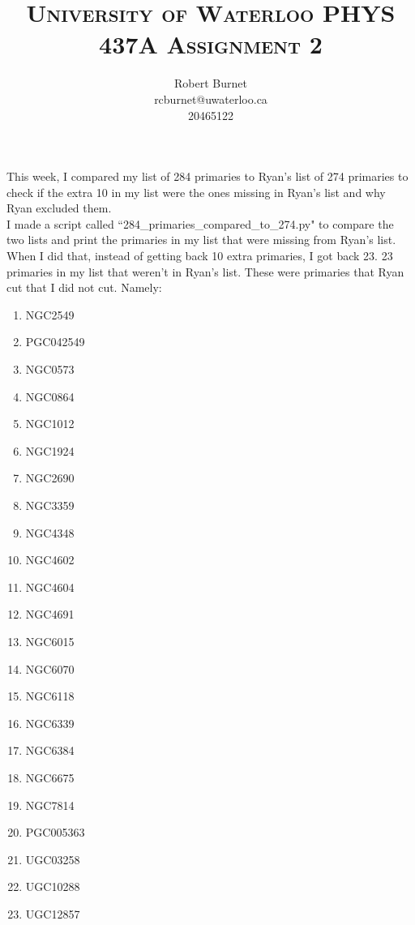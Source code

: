 \documentclass[10pt,letterpaper]{article}
\begin{document}
\title{\scshape\LARGE University of Waterloo \vfill \huge\bfseries PHYS 437A Assignment 2 \vfill}
\author{Robert Burnet \\ rcburnet@uwaterloo.ca \\ 20465122 }
\maketitle

\newpage

This week, I compared my list of 284 primaries to Ryan's list of 274 primaries to check if the extra 10 in my list were the ones missing in Ryan's list and why Ryan excluded them.\\

I made a script called ``284\_primaries\_compared\_to\_274.py" to compare the two lists and print the primaries in my list that were missing from Ryan's list. When I did that, instead of getting back 10 extra primaries, I got back 23. 23 primaries in my list that weren't in Ryan's list. These were primaries that Ryan cut that I did not cut. Namely:\\

\begin{enumerate}
\item NGC2549
\item PGC042549
\item NGC0573
\item NGC0864
\item NGC1012
\item NGC1924
\item NGC2690
\item NGC3359
\item NGC4348
\item NGC4602
\item NGC4604
\item NGC4691
\item NGC6015
\item NGC6070
\item NGC6118
\item NGC6339
\item NGC6384
\item NGC6675
\item NGC7814
\item PGC005363
\item UGC03258
\item UGC10288
\item UGC12857
\end{enumerate}
\end{document}
